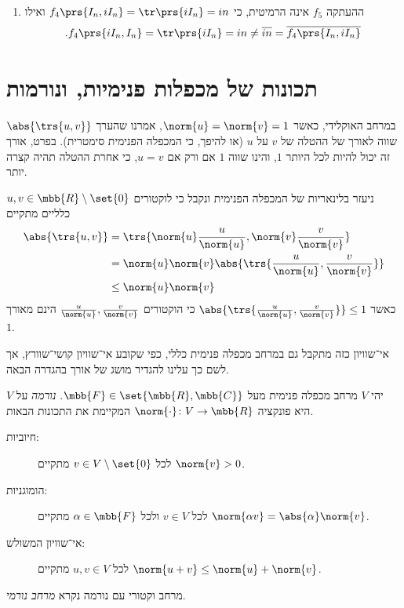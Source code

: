 \documentclass[a4paper,10pt,twoside,openany]{book}
\begin{document}
\begin{solution}
\begin{enumerate}
\item
ההעתקה
$f_5$
אינה הרמיטית, כי
$f_4\prs{I_n, iI_n} = \tr\prs{iI_n} = in$
ואילו
\[\text{.} f_4\prs{i I_n, I_n} = \tr\prs{iI_n} =in \neq \overline{in} = \overline{f_4\prs{I_n, iI_n}}\]
\end{enumerate}
\end{solution}

\section{תכונות של מכפלות פנימיות, ונורמות}

במרחב האוקלידי, כאשר
$\norm{u} = \norm{v} = 1$,
אמרנו שהערך
$\abs{\trs{u,v}}$
שווה לאורך של ההטלה של
$v$
על
$u$
(או להיפך, כי המכפלה הפנימית סימטרית).
בפרט, אורך זה יכול להיות לכל היותר
$1$,
והינו שווה
$1$
אם ורק אם
$u = v$,
כי אחרת ההטלה תהיה קצרה יותר.

ניעזר בלינאריות של המכפלה הפנימית ונקבל כי לוקטורים
$u,v \in \mbb{R} \setminus \set{0}$
כלליים מתקיים
\begin{align*}
\abs{\trs{u,v}} &= \trs{\norm{u} \frac{u}{\norm{u}}, \norm{v} \frac{v}{\norm{v}}}
\\&=
\norm{u} \norm{v} \abs{\trs{\frac{u}{\norm{u}}, \frac{v}{\norm{v}}}}
\\&\leq \norm{u} \norm{v}
\end{align*}
כאשר
$\abs{\trs{\frac{u}{\norm{u}}, \frac{v}{\norm{v}}}} \leq 1$
כי הוקטורים
$\frac{u}{\norm{u}}, \frac{v}{\norm{v}}$
הינם מאורך
$1$.

אי־שוויון כזה מתקבל גם במרחב מכפלה פנימית כללי, כפי שקובע אי־שוויון קושי־שוורץ, אך לשם כך עלינו להגדיר מושג של אורך בהגדרה הבאה.

\begin{definition}[נורמה]
יהי
$V$
מרחב מכפלה פנימית מעל
$\mbb{F} \in \set{\mbb{R}, \mbb{C}}$.
\emph{נורמה}
על
$V$
היא פונקציה
$\norm{\cdot} \colon V \to \mbb{R}$
המקיימת את התכונות הבאות.

\begin{description}
\item[חיוביות:]
לכל
$v \in V \setminus \set{0}$
מתקיים
$\norm{v} > 0$.

\item[הומוגניות:]
לכל
$v \in V$
ולכל
$\alpha \in \mbb{F}$
מתקיים
$\norm{\alpha v} = \abs{\alpha} \norm{v}$.

\item[אי־שוויון המשולש:]
לכל
$u,v \in V$
מתקיים
$\norm{u+v} \leq \norm{u} + \norm{v}$.
\end{description}

מרחב וקטורי עם נורמה נקרא
\emph{מרחב נורמי}.
\end{definition}
\end{document}

